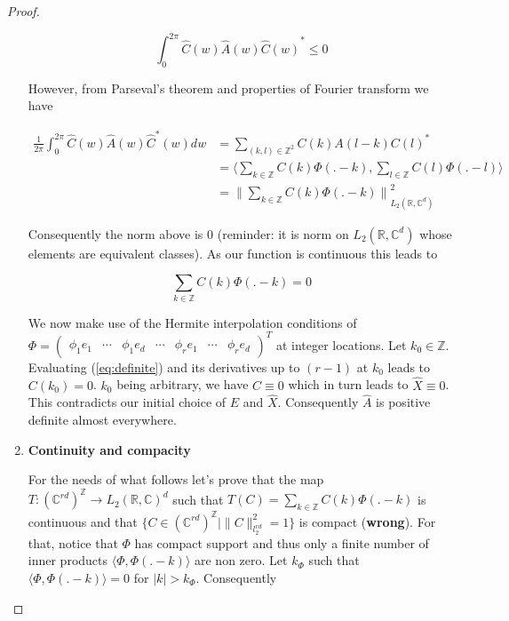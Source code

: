 \documentclass[a4paper, 11pt]{article}
\begin{document}
\begin{proof}
\begin{enumerate}
      \begin{equation*}
        \int_{0}^{2\pi} \hat{C}(w) \hat{A}(w) {\hat{C}(w)}^* \leq 0
      \end{equation*}

      However, from Parseval's theorem and properties of Fourier transform we have \
      
      \begin{align*}
        \frac{1}{2\pi} \int_{0}^{2\pi} \hat{C}(w) \hat{A}(w) \hat{C}^*(w) dw &= \sum_{(k, l) \in \mathbb{Z}^2} C(k) 
        A(l-k){C(l)}^* \\
        &= \langle \sum_{k \in \mathbb{Z}} C(k) \Phi(.-k), \sum_{l \in \mathbb{Z}} C(l) \Phi(.-l) \rangle \\
        &= {\| \sum_{k \in \mathbb{Z}} C(k) \Phi(.-k)\|}_{L_2(\mathbb{R}, \mathbb{C}^{d})}^2
      \end{align*}

      Consequently the norm above is 0 (reminder: it is norm on $L_2(\mathbb{R}, \mathbb{C}^{d})$ whose elements are 
      equivalent classes). As our function is continuous this leads to
    
      \begin{equation}
        \label{eq:definite}
        \sum_{k \in \mathbb{Z}} C(k) \Phi(.-k) = 0
      \end{equation}
      
      We now make use of the Hermite interpolation conditions of $\Phi = \begin{pmatrix} \phi_1 e_1 & \cdots & \phi_1 
      e_d & \cdots & \phi_r e_1 & \cdots & \phi_r e_d \end{pmatrix}^T $ at integer locations. Let $k_0 \in \mathbb{Z}$.  
      Evaluating (\ref{eq:definite}) and its derivatives up to $(r-1)$ at $k_0$ leads to $C(k_0) = 0$. $k_0$ being 
      arbitrary, we have $C \equiv 0$ which in turn leads to $\hat{X} \equiv 0$. This contradicts our initial choice of 
      $E$ and $\hat{X}$. Consequently $\hat{A}$ is positive definite almost everywhere.

    \item{\textbf{Continuity and compacity}}

      For the needs of what follows let's prove that the map $T: {(\mathbb{C}^{rd})}^{\mathbb{Z}} \to L_2(\mathbb{R}, 
      \mathbb{C})^d$ such that $T(C) = \sum_{k \in \mathbb{Z}} C(k) \Phi(.-k)$ is continuous and that $\{C \in 
      {(\mathbb{C}^{rd})}^{\mathbb{Z}} | \|C\|^2_{l_2^{rd}} = 1 \}$ is compact (\textbf{wrong}). For that, notice that 
      $\Phi$ has compact support and thus only a finite number of inner products $\langle \Phi, \Phi(.-k) \rangle$ are 
      non zero.  Let $k_{\Phi}$ such that $\langle \Phi, \Phi(.-k) \rangle = 0$ for $|k| > k_{\Phi}$.  Consequently


\end{enumerate}
\end{proof}
\end{document}
